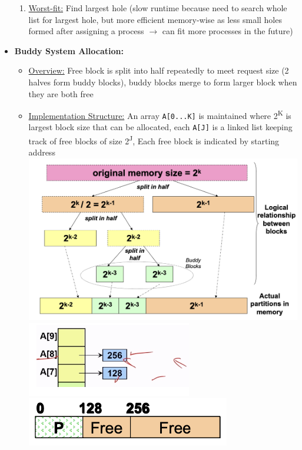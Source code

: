 \documentclass[landscape]{article}
\begin{document}
\begin{multicols*}{6}
\begin{itemize}
\begin{enumerate}
        \item \underline{Worst-fit:} Find largest hole (slow runtime because need to search whole list for largest hole, but more efficient memory-wise as less small holes formed after assigning a process $\rightarrow$ can fit more processes in the future)
      \end{enumerate}
      \item \textbf{Buddy System Allocation:}
      \begin{itemize}
        \item \underline{Overview:} Free block is split into half repeatedly to meet request size (2 halves form buddy blocks), buddy blocks merge to form larger block when they are both free
        \item \underline{Implementation Structure:} An array \verb|A[0...K]| is maintained where 2\textsuperscript{K} is largest block size that can be allocated, each \verb|A[J]| is a linked list keeping track of free blocks of size 2\textsuperscript{J}, Each free block is indicated by starting address
        \includegraphics[width=0.9\linewidth]{14_buddy_system_overview.png}
        \includegraphics[width=0.7\linewidth]{15_buddy_system_linked_list.png}
        \includegraphics[width=0.6\linewidth]{16_buddy_system_layout.png}

\end{itemize}
\end{itemize}
\end{multicols*}
\end{document}
